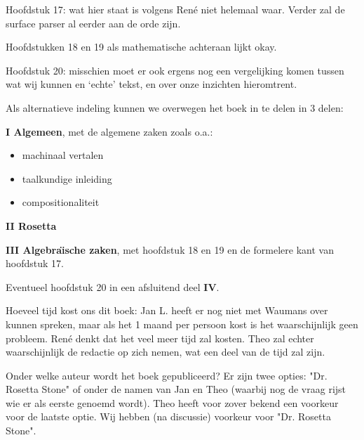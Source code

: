 \begin{enumerate}
        Hoofdstuk 17: wat hier staat is volgens Ren\'{e} niet helemaal waar.
        Verder zal de surface parser al eerder aan de orde zijn.

        Hoofdstukken 18 en 19 als mathematische achteraan lijkt okay.

        Hoofdstuk 20: misschien moet er ook ergens nog een vergelijking komen
        tussen wat wij kunnen en `echte' tekst, en over onze inzichten 
        hieromtrent. 

        Als alternatieve indeling kunnen we overwegen het boek in te delen in
        3 delen:

        {\bf I Algemeen}, met de algemene zaken zoals o.a.:
        \begin{itemize}
          \item machinaal vertalen
          \item taalkundige inleiding
          \item compositionaliteit
        \end{itemize}

        {\bf II Rosetta}

        {\bf III Algebra\"{\i}sche zaken}, met hoofdstuk 18 en 19 en 
        de formelere kant van hoofdstuk 17.

        Eventueel hoofdstuk 20 in een afsluitend deel {\bf IV}.
       
        Hoeveel tijd kost ons dit boek: Jan L. heeft er nog niet met 
        Waumans over kunnen spreken, maar als het 1 maand per persoon kost is 
        het waarschijnlijk geen probleem.
        Ren\'{e} denkt dat het veel meer tijd zal
        kosten. Theo zal echter waarschijnlijk de redactie op zich nemen, wat
        een deel van de tijd zal zijn.

        Onder welke auteur wordt het boek gepubliceerd? Er zijn twee opties:
        "Dr. Rosetta Stone" of onder de namen van Jan en Theo (waarbij nog
        de vraag rijst wie er als eerste genoemd wordt). Theo heeft voor
        zover bekend een voorkeur voor de laatste optie. Wij hebben
        (na discussie) voorkeur voor "Dr. Rosetta Stone".
        
\end {enumerate}

